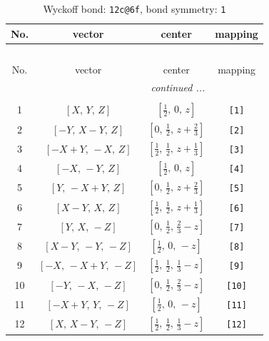 \documentclass[fleqn,8pt]{jsarticle}
\begin{document}
\begin{longtable}{cccc}
\caption{Wyckoff bond: {\tt 12c@6f}, bond symmetry: {\tt 1}}
 \\
 \hline \hline
No. & vector & center & mapping \\ \hline \endfirsthead

\multicolumn{3}{l}{\tablename\ \thetable{}} \\
 \hline \hline
No. & vector & center & mapping \\ \hline \endhead

 \hline \hline
\multicolumn{3}{r}{\footnotesize\it continued ...} \\ \endfoot

 \hline \hline
\multicolumn{3}{r}{} \\ \endlastfoot

1 & $\left[ X,\, Y,\, Z \right]$ & $\left[ \frac{1}{2},\, 0,\, z \right]$ & {\tt [1]} \\ \hline
2 & $\left[ - Y,\, X - Y,\, Z \right]$ & $\left[ 0,\, \frac{1}{2},\, z + \frac{2}{3} \right]$ & {\tt [2]} \\ \hline
3 & $\left[ - X + Y,\, - X,\, Z \right]$ & $\left[ \frac{1}{2},\, \frac{1}{2},\, z + \frac{1}{3} \right]$ & {\tt [3]} \\ \hline
4 & $\left[ - X,\, - Y,\, Z \right]$ & $\left[ \frac{1}{2},\, 0,\, z \right]$ & {\tt [4]} \\ \hline
5 & $\left[ Y,\, - X + Y,\, Z \right]$ & $\left[ 0,\, \frac{1}{2},\, z + \frac{2}{3} \right]$ & {\tt [5]} \\ \hline
6 & $\left[ X - Y,\, X,\, Z \right]$ & $\left[ \frac{1}{2},\, \frac{1}{2},\, z + \frac{1}{3} \right]$ & {\tt [6]} \\ \hline
7 & $\left[ Y,\, X,\, - Z \right]$ & $\left[ 0,\, \frac{1}{2},\, \frac{2}{3} - z \right]$ & {\tt [7]} \\ \hline
8 & $\left[ X - Y,\, - Y,\, - Z \right]$ & $\left[ \frac{1}{2},\, 0,\, - z \right]$ & {\tt [8]} \\ \hline
9 & $\left[ - X,\, - X + Y,\, - Z \right]$ & $\left[ \frac{1}{2},\, \frac{1}{2},\, \frac{1}{3} - z \right]$ & {\tt [9]} \\ \hline
10 & $\left[ - Y,\, - X,\, - Z \right]$ & $\left[ 0,\, \frac{1}{2},\, \frac{2}{3} - z \right]$ & {\tt [10]} \\ \hline
11 & $\left[ - X + Y,\, Y,\, - Z \right]$ & $\left[ \frac{1}{2},\, 0,\, - z \right]$ & {\tt [11]} \\ \hline
12 & $\left[ X,\, X - Y,\, - Z \right]$ & $\left[ \frac{1}{2},\, \frac{1}{2},\, \frac{1}{3} - z \right]$ & {\tt [12]} \\
\end{longtable}
\end{document}
